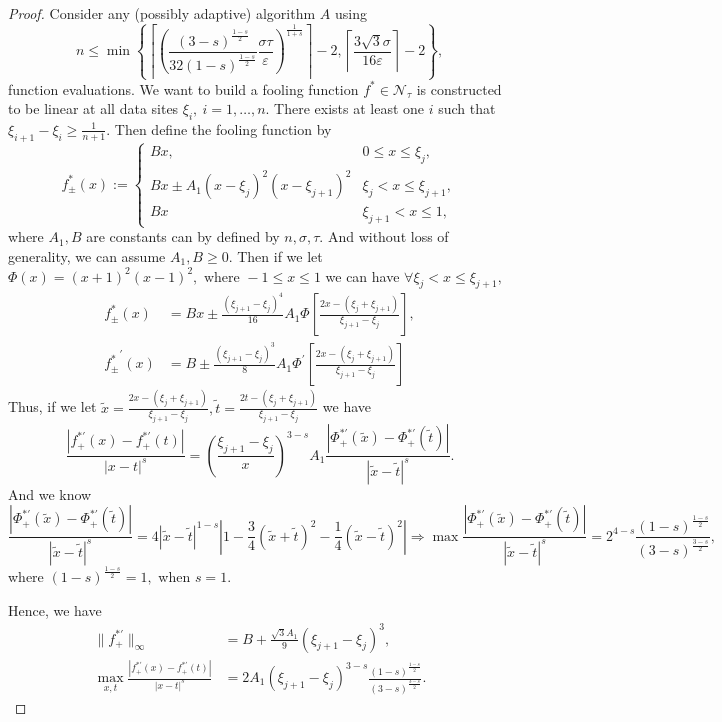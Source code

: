 \begin{proof}
Consider any (possibly
adaptive) algorithm $A$ using $$n \leq \min\left\{\left\lceil  \left(\frac{(3-s)^{\frac{1-s}{2}}}{32(1-s)^{\frac{1-s}{2}}}\frac{\sigma\tau}{\varepsilon}\right)^{\frac{1}{1+s}} \right\rceil-2, \left\lceil \frac{3\sqrt{3}\sigma}{16\varepsilon}\right\rceil-2 \right\},$$
function evaluations. We want to build a fooling function $f^{*} \in \mathcal{N}_{\tau}$
is constructed to be linear at all data sites $\xi_{i}, \ i=1,\ldots,n.$ There exists at least one $i$ such that $\xi_{i+1}-\xi_{i}\ge\frac{1}{n+1}.$ Then define the fooling function by
$$f_{\pm}^{*}(x):=\left\{\begin{matrix}
Bx, & 0 \leq x \leq \xi_{j},\\
Bx\pm A_{1}(x-\xi_{j})^{2}(x-\xi_{j+1})^{2} & \xi_{j}< x \leq \xi_{j+1},\\
Bx & \xi_{j+1}< x \leq 1,
\end{matrix}\right.$$
where $A_{1},B$ are constants can by defined by $n,\sigma,\tau.$ And without loss of generality, we can assume $A_{1},B \ge 0.$
Then if we let $\Phi(x)=(x+1)^2(x-1)^2, \text{ where } -1 \leq x \leq 1$
we can have $\forall \xi_{j}< x \leq \xi_{j+1},$
\begin{align*}f_{\pm}^{*}(x)&=Bx\pm  \frac{(\xi_{j+1}-\xi_{j})^{4}}{16}A_{1}\Phi\left[\frac{2x-(\xi_{j}+\xi_{j+1})}{\xi_{j+1}-\xi_{j}}\right], \\
{f_{\pm}^{*}}^{'}(x)&=B \pm \frac{(\xi_{j+1}-\xi_{j})^{3}}{8}A_{1}\Phi^{'}\left[\frac{2x-(\xi_{j}+\xi_{j+1})}{\xi_{j+1}-\xi_{j}}\right]
\end{align*}
Thus, if we let $\tilde{x}=\frac{2x-(\xi_{j}+\xi_{j+1})}{\xi_{j+1}-\xi_{j}}, \tilde{t}=\frac{2t-(\xi_{j}+\xi_{j+1})}{\xi_{j+1}-\xi_{j}} $ we have
$$\frac{|f_{+}^{*'}(x)-f_{+}^{*'}(t)|}{|x-t|^{s}}=\left(\frac{\xi_{j+1}-\xi_{j}}{x}\right)^{3-s}A_{1}\frac{|\Phi_{+}^{*'}(\tilde{x})-\Phi_{+}^{*'}(\tilde{t})|}
{|\tilde{x}-\tilde{t}|^{s}}.$$
And we know
$$\frac{|\Phi_{+}^{*'}(\tilde{x})-\Phi_{+}^{*'}(\tilde{t})|}
{|\tilde{x}-\tilde{t}|^{s}}=4|\tilde{x}-\tilde{t}|^{1-s}\left|1-\frac{3}{4}(\tilde{x}+\tilde{t})^{2}-\frac{1}{4}(\tilde{x}-\tilde{t})^{2}\right|
\Rightarrow \max \frac{|\Phi_{+}^{*'}(\tilde{x})-\Phi_{+}^{*'}(\tilde{t})|}
{|\tilde{x}-\tilde{t}|^{s}}=2^{4-s}\frac{(1-s)^{\frac{1-s}{2}}}{(3-s)^{\frac{3-s}{2}}},$$
where $(1-s)^{\frac{1-s}{2}}=1,$ when $s=1.$

Hence, we have
\begin{align*}\|f_{+}^{*'}\|_{\infty}&=B+\frac{\sqrt{3}A_{1}}{9}(\xi_{j+1}-\xi_{j})^{3}, \\ \max_{x,t}\frac{|f_{+}^{*'}(x)-f_{+}^{*'}(t)|}{|x-t|^{s}}&=2A_{1}(\xi_{j+1}-\xi_{j})^{3-s}\frac{(1-s)^{\frac{1-s}{2}}}{(3-s)^{\frac{3-s}{2}}}.
\end{align*}


\end{proof}
